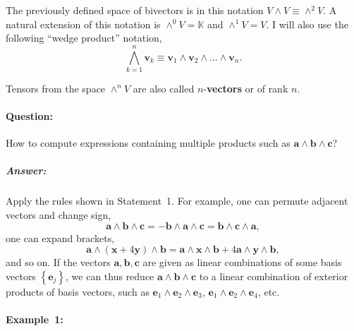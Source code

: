 The previously defined space of bivectors is in this notation $V\wedge V\equiv\wedge^{2}V$.
A natural extension of this notation is $\wedge^{0}V=\mathbb{K}$
and $\wedge^{1}V=V$. I will also use the following {}``wedge product''
notation,\[
\bigwedge_{k=1}^{n}\mathbf{v}_{k}\equiv\mathbf{v}_{1}\wedge\mathbf{v}_{2}\wedge...\wedge\mathbf{v}_{n}.\]


Tensors from the space $\wedge^{n}V$ are also called $n$-\textbf{vectors}
or  of
rank $n$.


\paragraph{Question:}

How to compute expressions containing multiple products such as $\mathbf{a}\wedge\mathbf{b}\wedge\mathbf{c}$?


\subparagraph{Answer:}

Apply the rules shown in Statement~1. For example, one can permute
adjacent vectors and change sign,\[
\mathbf{a}\wedge\mathbf{b}\wedge\mathbf{c}=-\mathbf{b}\wedge\mathbf{a}\wedge\mathbf{c}=\mathbf{b}\wedge\mathbf{c}\wedge\mathbf{a},\]
one can expand brackets,\[
\mathbf{a}\wedge(\mathbf{x}+4\mathbf{y})\wedge\mathbf{b}=\mathbf{a}\wedge\mathbf{x}\wedge\mathbf{b}+4\mathbf{a}\wedge\mathbf{y}\wedge\mathbf{b},\]
and so on. If the vectors $\mathbf{a},\mathbf{b},\mathbf{c}$ are
given as linear combinations of some basis vectors $\left\{ \mathbf{e}_{j}\right\} $,
we can thus reduce $\mathbf{a}\wedge\mathbf{b}\wedge\mathbf{c}$ to
a linear combination of exterior products of basis vectors, such as
$\mathbf{e}_{1}\wedge\mathbf{e}_{2}\wedge\mathbf{e}_{3}$, $\mathbf{e}_{1}\wedge\mathbf{e}_{2}\wedge\mathbf{e}_{4}$,
etc.



\paragraph{Example~1:}

